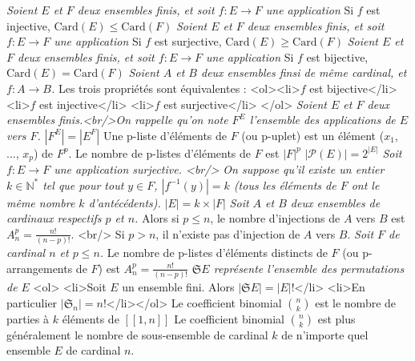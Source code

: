 \documentclass[11pt]{article}
\newcommand{\bb}[1]{\mathbb{#1}}
\newcommand{\N}{\bb{N}}
\newcommand{\gt}{>}
\begin{document}
\textit{ Soient $E$ et $F$ deux ensembles finis, et soit $f: E \longrightarrow F$ une application }
Si $f$ est injective, $\text{Card}(E) \leqslant \text{Card}(F)$
\textit{ Soient $E$ et $F$ deux ensembles finis, et soit $f: E \longrightarrow F$ une application }
Si $f$ est surjective, $\text{Card}(E) \geqslant \text{Card}(F)$
\textit{ Soient $E$ et $F$ deux ensembles finis, et soit $f: E \longrightarrow F$ une application }
Si $f$ est bijective, $\text{Card}(E) = \text{Card}(F)$
\textit{ Soient $A$ et $B$ deux ensembles finsi de même cardinal, et $f: A \longrightarrow B$. }
Les trois propriétés sont équivalentes : <ol><li>$f$ est bijective</li> <li>$f$ est injective</li> <li>$f$ est surjective</li> </ol>
\textit{ Soient $E$ et $F$ deux ensembles finis.<br/>On rappelle qu'on note $F^E$ l'ensemble des applications de $E$ vers $F$. }
$|F^E| = |E^F|$
\textit{  }
Une p-liste d'éléments de $F$ (ou p-uplet) est un élément ($x_1$, ..., $x_p$) de $F^p$.
\textit{  }
Le nombre de p-listes d'éléments de $F$ est $|F|^p$
\textit{  }
$|\mathcal{P}(E)| = 2^{|E|}$
\textit{ Soit $f: E \longrightarrow F$ une application surjective. <br/> On suppose qu'il existe un entier $k \in \N^* $ tel que pour tout $y \in F$, $|f^{-1}(y)| = k$ (tous les éléments de $F$ ont le même nombre $k$ d'antécédents). }
$|E| = k \times |F|$
\textit{ Soit $A$ et $B$ deux ensembles de cardinaux respectifs $p$ et $n$. }
Alors si $p \leqslant n$, le nombre d'injections de $A$ vers $B$ est $A_n^p  = \frac{n!}{(n-p)!}$. <br/> Si $p \gt n$, il n'existe pas d'injection de $A$ vers $B$.
\textit{ Soit $F$ de cardinal $n$ et $p \leqslant n$. }
Le nombre de p-listes d'éléments distincts de $F$ (ou p-arrangements de $F$) est $A_n^p = \frac{n!}{(n-p)!}$
\textit{ $\mathfrak{S}E$ représente l'ensemble des permutations de $E$ }
<ol> <li>Soit $E$ un ensemble fini. Alors $|\mathfrak{S} E| = |E|!$</li> <li>En particulier $|\mathfrak{S}_n| = n!$</li></ol>
\textit{  }
Le coefficient binomial $\binom{n}{k}$ est le nombre de parties à $k$ éléments de $[\![1,n]\!]$
\textit{  }
Le coefficient binomial $\binom{n}{k}$ est plus généralement le nombre de sous-ensemble de cardinal $k$ de n'importe quel ensemble $E$ de cardinal $n$.
\end{document}
